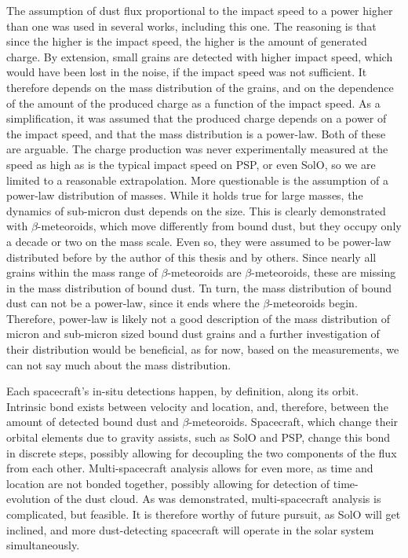 The assumption of dust flux proportional to the impact speed to a power higher than one was used in several works, including this one. The reasoning is that since the higher is the impact speed, the higher is the amount of generated charge. By extension, small grains are detected with higher impact speed, which would have been lost in the noise, if the impact speed was not sufficient. It therefore depends on the mass distribution of the grains, and on the dependence of the amount of the produced charge as a function of the impact speed. As a simplification, it was assumed that the produced charge depends on a power of the impact speed, and that the mass distribution is a power-law. Both of these are arguable. The charge production was never experimentally measured at the speed as high as is the typical impact speed on PSP, or even SolO, so we are limited to a reasonable extrapolation. More questionable is the assumption of a power-law distribution of masses. While it holds true for large masses, the dynamics of sub-micron dust depends on the size. This is clearly demonstrated with $\beta$-meteoroids, which move differently from bound dust, but they occupy only a decade or two on the mass scale. Even so, they were assumed to be power-law distributed before by the author of this thesis and by others. Since nearly all grains within the mass range of $\beta$-meteoroids are $\beta$-meteoroids, these are missing in the mass distribution of bound dust. Tn turn, the mass distribution of bound dust can not be a power-law, since it ends where the $\beta$-meteoroids begin. Therefore, power-law is likely not a good description of the mass distribution of micron and sub-micron sized bound dust grains and a further investigation of their distribution would be beneficial, as for now, based on the measurements, we can not say much about the mass distribution.

Each spacecraft's in-situ detections happen, by definition, along its orbit. Intrinsic bond exists between velocity and location, and, therefore, between the amount of detected bound dust and $\beta$-meteoroids. Spacecraft, which change their orbital elements due to gravity assists, such as SolO and PSP, change this bond in discrete steps, possibly allowing for decoupling the two components of the flux from each other. Multi-spacecraft analysis allows for even more, as time and location are not bonded together, possibly allowing for detection of time-evolution of the dust cloud. As was demonstrated, multi-spacecraft analysis is complicated, but feasible. It is therefore worthy of future pursuit, as SolO will get inclined, and more dust-detecting spacecraft will operate in the solar system simultaneously. 